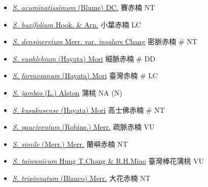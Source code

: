\begin{itemize}
  \begin{itemize}
        \item[] \href{http://www.theplantlist.org/tpl1.1/search?q=Syzygium+acuminatissimum}{\textit{S. acuminatissimum} (Blume) DC.}   賽赤楠   NT
        \item[] \href{http://www.theplantlist.org/tpl1.1/search?q=Syzygium+buxifolium}{\textit{S. buxifolium} Hook. \& Arn.}   小葉赤楠   LC
        \item[] \href{http://www.theplantlist.org/tpl1.1/search?q=Syzygium+densinervium+var.+insulare}{\textit{S. densinervium} Merr. var. \textit{insulare} Chang}   密脈赤楠  \# NT
        \item[] \href{http://www.theplantlist.org/tpl1.1/search?q=Syzygium+euphlebium}{\textit{S. euphlebium} (Hayata) Mori}   細脈赤楠  \# DD
        \item[] \href{http://www.theplantlist.org/tpl1.1/search?q=Syzygium+formosanum}{\textit{S. formosanum} (Hayata) Mori}   臺灣赤楠  \# LC
        \item[] \href{http://www.theplantlist.org/tpl1.1/search?q=Syzygium+jambos}{\textit{S. jambos} (L.) Alston}   蒲桃   NA (N)
        \item[] \href{http://www.theplantlist.org/tpl1.1/search?q=Syzygium+kusukusense}{\textit{S. kusukusense} (Hayata) Mori}   高士佛赤楠  \# NT
        \item[] \href{http://www.theplantlist.org/tpl1.1/search?q=Syzygium+paucivenium}{\textit{S. paucivenium} (Robins.) Merr.}   疏脈赤楠   VU
        \item[] \href{http://www.theplantlist.org/tpl1.1/search?q=Syzygium+simile}{\textit{S. simile} (Merr.) Merr.}   蘭嶼赤楠   NT
        \item[] \href{http://www.theplantlist.org/tpl1.1/search?q=Syzygium+taiwanicum}{\textit{S. taiwanicum} Hung T.Chang \& R.H.Miao}   臺灣棒花蒲桃   VU
        \item[] \href{http://www.theplantlist.org/tpl1.1/search?q=Syzygium+tripinnatum}{\textit{S. tripinnatum} (Blanco) Merr.}   大花赤楠   NT
  \end{itemize}
  \end{itemize}
